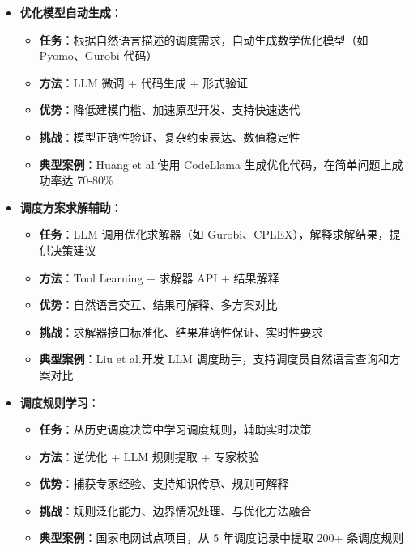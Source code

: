 \documentclass[12pt,a4paper]{article}
\begin{document}
\begin{itemize}
    \item \textbf{优化模型自动生成}：
    \begin{itemize}
        \item \textbf{任务}：根据自然语言描述的调度需求，自动生成数学优化模型（如 Pyomo、Gurobi 代码）
        \item \textbf{方法}：LLM 微调 + 代码生成 + 形式验证
        \item \textbf{优势}：降低建模门槛、加速原型开发、支持快速迭代
        \item \textbf{挑战}：模型正确性验证、复杂约束表达、数值稳定性
        \item \textbf{典型案例}：Huang et al.\cite{madaan2023self}使用 CodeLlama 生成优化代码，在简单问题上成功率达 70-80\%
    \end{itemize}
    
    \item \textbf{调度方案求解辅助}：
    \begin{itemize}
        \item \textbf{任务}：LLM 调用优化求解器（如 Gurobi、CPLEX），解释求解结果，提供决策建议
        \item \textbf{方法}：Tool Learning + 求解器 API + 结果解释
        \item \textbf{优势}：自然语言交互、结果可解释、多方案对比
        \item \textbf{挑战}：求解器接口标准化、结果准确性保证、实时性要求
        \item \textbf{典型案例}：Liu et al.\cite{huang2022large}开发 LLM 调度助手，支持调度员自然语言查询和方案对比
    \end{itemize}
    
    \item \textbf{调度规则学习}：
    \begin{itemize}
        \item \textbf{任务}：从历史调度决策中学习调度规则，辅助实时决策
        \item \textbf{方法}：逆优化 + LLM 规则提取 + 专家校验
        \item \textbf{优势}：捕获专家经验、支持知识传承、规则可解释
        \item \textbf{挑战}：规则泛化能力、边界情况处理、与优化方法融合
        \item \textbf{典型案例}：国家电网试点项目，从 5 年调度记录中提取 200+ 条调度规则
    \end{itemize}
    

\end{itemize}
\end{document}
